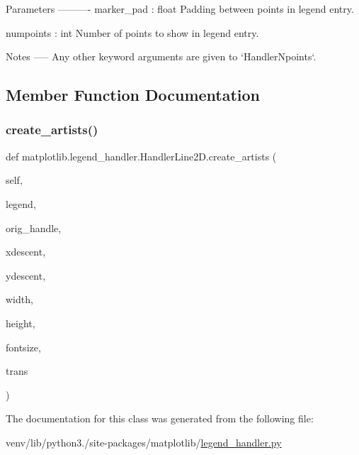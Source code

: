 \begin{DoxyVerb}Parameters
----------
marker_pad : float
    Padding between points in legend entry.

numpoints : int
    Number of points to show in legend entry.

Notes
-----
Any other keyword arguments are given to `HandlerNpoints`.
\end{DoxyVerb}
 

\subsection{Member Function Documentation}
\mbox{\label{classmatplotlib_1_1legend__handler_1_1HandlerLine2D_a999bdbbf7275b4a6225f70f989bf4d56}} 
\subsubsection{\texorpdfstring{create\+\_\+artists()}{create\_artists()}}
{\footnotesize\ttfamily def matplotlib.\+legend\+\_\+handler.\+Handler\+Line2\+D.\+create\+\_\+artists (\begin{DoxyParamCaption}\item[{}]{self,  }\item[{}]{legend,  }\item[{}]{orig\+\_\+handle,  }\item[{}]{xdescent,  }\item[{}]{ydescent,  }\item[{}]{width,  }\item[{}]{height,  }\item[{}]{fontsize,  }\item[{}]{trans }\end{DoxyParamCaption})}



The documentation for this class was generated from the following file\+:\begin{DoxyCompactItemize}
\item 
venv/lib/python3./site-\/packages/matplotlib/\hyperlink{legend__handler_8py}{legend\+\_\+handler.\+py}\end{DoxyCompactItemize}
